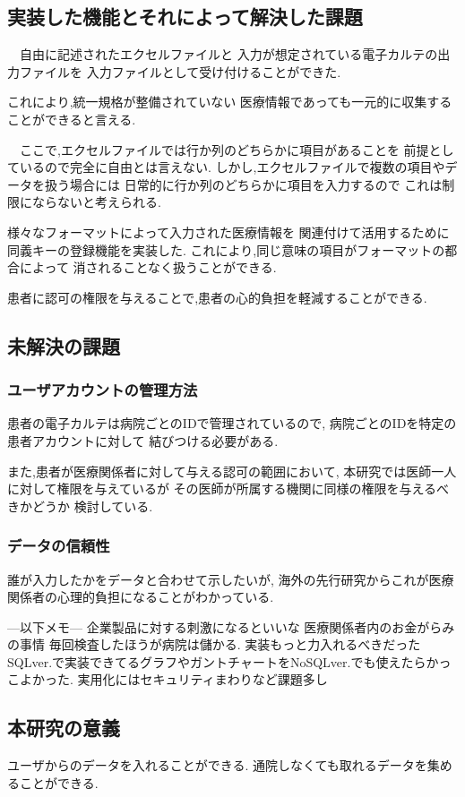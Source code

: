 \subsection{実装した機能とそれによって解決した課題}
  　自由に記述されたエクセルファイルと
  入力が想定されている電子カルテの出力ファイルを
  入力ファイルとして受け付けることができた.

  これにより,統一規格が整備されていない
  医療情報であっても一元的に収集することができると言える.


  　ここで,エクセルファイルでは行か列のどちらかに項目があることを
  前提としているので完全に自由とは言えない.
  しかし,エクセルファイルで複数の項目やデータを扱う場合には
  日常的に行か列のどちらかに項目を入力するので
  これは制限にならないと考えられる.

  様々なフォーマットによって入力された医療情報を
  関連付けて活用するために同義キーの登録機能を実装した.
  これにより,同じ意味の項目がフォーマットの都合によって
  消されることなく扱うことができる.

  患者に認可の権限を与えることで,患者の心的負担を軽減することができる.





\subsection{未解決の課題}
  \subsubsection{ユーザアカウントの管理方法}
    患者の電子カルテは病院ごとのIDで管理されているので,
    病院ごとのIDを特定の患者アカウントに対して
    結びつける必要がある.

    また,患者が医療関係者に対して与える認可の範囲において,
    本研究では医師一人に対して権限を与えているが
    その医師が所属する機関に同様の権限を与えるべきかどうか
    検討している.
  \fi

  \subsubsection{データの信頼性}
     誰が入力したかをデータと合わせて示したいが,
     海外の先行研究からこれが医療関係者の心理的負担になることがわかっている.
     \cite{bibi10}

---以下メモ---
企業製品に対する刺激になるといいな
医療関係者内のお金がらみの事情
   毎回検査したほうが病院は儲かる.
実装もっと力入れるべきだった
    SQLver.で実装できてるグラフやガントチャートをNoSQLver.でも使えたらかっこよかった.
実用化にはセキュリティまわりなど課題多し

 \subsection{本研究の意義}
   ユーザからのデータを入れることができる.
   通院しなくても取れるデータを集めることができる.
